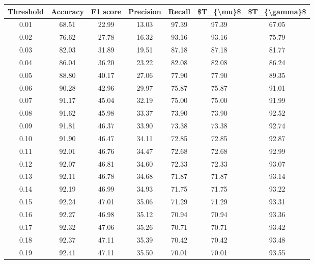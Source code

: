 \begin{tabular}{|c|c|c|c|c|c|c|}
\toprule
 Threshold &  Accuracy &  F1 score &  Precision &  Recall &  \$T\_\{\textbackslash mu\}\$ &  \$T\_\{\textbackslash gamma\}\$ \\
\hline
      0.01 &     68.51 &     22.99 &      13.03 &   97.39 &      97.39 &         67.05 \\
      0.02 &     76.62 &     27.78 &      16.32 &   93.16 &      93.16 &         75.79 \\
      0.03 &     82.03 &     31.89 &      19.51 &   87.18 &      87.18 &         81.77 \\
      0.04 &     86.04 &     36.20 &      23.22 &   82.08 &      82.08 &         86.24 \\
      0.05 &     88.80 &     40.17 &      27.06 &   77.90 &      77.90 &         89.35 \\
      0.06 &     90.28 &     42.96 &      29.97 &   75.87 &      75.87 &         91.01 \\
      0.07 &     91.17 &     45.04 &      32.19 &   75.00 &      75.00 &         91.99 \\
      0.08 &     91.62 &     45.98 &      33.37 &   73.90 &      73.90 &         92.52 \\
      0.09 &     91.81 &     46.37 &      33.90 &   73.38 &      73.38 &         92.74 \\
      0.10 &     91.90 &     46.47 &      34.11 &   72.85 &      72.85 &         92.87 \\
      0.11 &     92.01 &     46.76 &      34.47 &   72.68 &      72.68 &         92.99 \\
      0.12 &     92.07 &     46.81 &      34.60 &   72.33 &      72.33 &         93.07 \\
      0.13 &     92.11 &     46.78 &      34.68 &   71.87 &      71.87 &         93.14 \\
      0.14 &     92.19 &     46.99 &      34.93 &   71.75 &      71.75 &         93.22 \\
      0.15 &     92.24 &     47.01 &      35.06 &   71.29 &      71.29 &         93.31 \\
      0.16 &     92.27 &     46.98 &      35.12 &   70.94 &      70.94 &         93.36 \\
      0.17 &     92.32 &     47.06 &      35.26 &   70.71 &      70.71 &         93.42 \\
      0.18 &     92.37 &     47.11 &      35.39 &   70.42 &      70.42 &         93.48 \\
      0.19 &     92.41 &     47.11 &      35.50 &   70.01 &      70.01 &         93.55 \\

\end{tabular}
